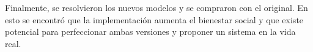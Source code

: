 Finalmente, se resolvieron los nuevos modelos y se compraron con el original. En esto se encontró que la implementación aumenta el bienestar social y que existe potencial para perfeccionar ambas versiones y proponer un sistema en la vida real.







  \cleardoublepage
  \tableofcontents
  \cleardoublepage
  \listoffigures
  \cleardoublepage
  \listoftables
  \cleardoublepage

  \normalsize

